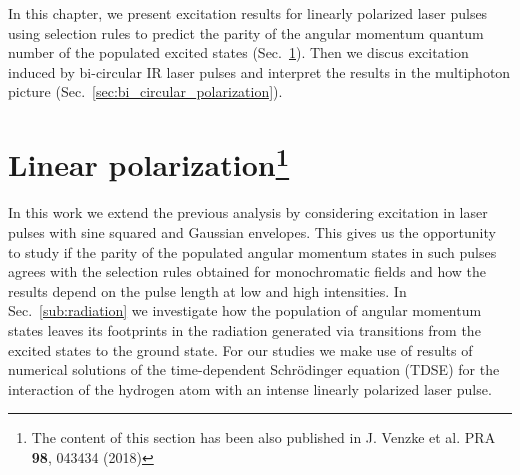 In this chapter, we present excitation results for linearly polarized laser pulses using selection rules to predict the parity of the angular momentum quantum number of the populated excited states (Sec.~\ref{sec:linear_polarization}). Then we discus excitation induced by bi-circular IR laser pulses and interpret the results in the multiphoton picture (Sec.~\ref{sec:bi_circular_polarization}). 



\section[Linear polarization]{Linear polarization\protect\footnote{The content of this section has been also published in J. Venzke et al. PRA \textbf{98}, 043434 (2018)}} %
\label{sec:linear_polarization}

In this work we extend the previous analysis by considering excitation in laser pulses with sine squared and Gaussian envelopes. This gives us the opportunity to study if the parity of the populated angular momentum states in such pulses agrees with the selection rules obtained for monochromatic fields and how the results depend on the pulse length at low and high intensities. In Sec.~\ref{sub:radiation} we investigate how the population of angular momentum states leaves its footprints in the radiation generated via transitions from the excited states to the ground state. For our studies we make use of results of numerical solutions of the time-dependent Schr\"odinger equation (TDSE) for the interaction of the hydrogen atom with an intense linearly polarized laser pulse.


